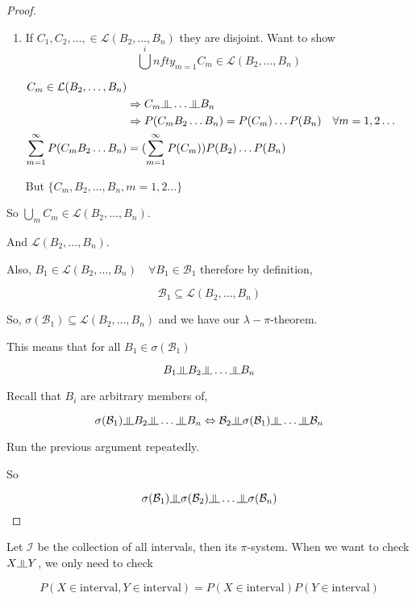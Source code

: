 \documentclass[11pt,fleqn]{book} %
\newcommand{\indep}{\rotatebox[origin=c]{90}{$\models$}}
\begin{document}
\begin{proof}
\begin{enumerate}
		\item If $C_1, C_2, \dots, \in \mathcal{L}(B_2, \dots, B_n)$ they are disjoint. Want to show 
		$$\bigcup^infty_{m=1}C_m \in \mathcal{L}(B_2, \dots, B_n) $$

		$\begin{aligned}
			C_m \in \mathcal{L}(B_2, \dots, B_n)\\
			&\Rightarrow C_m \indep \dots \indep B_n\\
			&\Rightarrow P(C_m B_2 \dots B_n) = P(C_m)\dots P(B_n) \quad \forall m = 1, 2 \dots\\
			\displaystyle \sum^\infty_{m=1} P(C_m B_2 \dots B_n) &= (\displaystyle \sum^\infty_{m=1} P(C_m) )P(B_2)\dots P(B_n)
		\end{aligned}$

		But $\{C_m, B_2, \dots, B_n, m = 1, 2 \dots \}$


		
	\end{enumerate}
 So $\bigcup_m C_m \in \mathcal{L}(B_2, \dots, B_n)$. 

		And $\mathcal{L}(B_2, \dots, B_n)$. 

		Also, $ B_1 \in \mathcal{L}(B_2, \dots, B_n) \quad \forall B_1 \in \mathcal{B}_1$ therefore by definition, 

		$$\mathcal{B}_1 \subseteq \mathcal{L}(B_2, \dots, B_n) $$

So, $ \sigma(\mathcal{B}_1) \subseteq \mathcal{L}(B_2, \dots, B_n)$ and we have our $\lambda-\pi$-theorem.

This means that for all $B_1 \in \sigma(\mathcal{B}_1)$

$$B_1 \indep B_2 \indep \dots \indep B_n $$

Recall that $B_i $ are arbitrary members of,

$$\sigma(\mathcal{B}_1) \indep B_2 \indep \dots \indep B_n \Leftrightarrow \mathcal{B}_2 \indep \sigma(\mathcal{B}_1) \indep \dots \indep \mathcal{B}_n$$

Run the previous argument repeatedly. 

So

$$ \sigma(\mathcal{B}_1) \indep \sigma(\mathcal{B}_2) \indep \dots \indep \sigma(\mathcal{B}_n)$$ 

\end{proof}


\begin{example}
	Let $\mathcal{I}$ be the collection of all intervals, then its $\pi$-system. When we want to check $X \indep Y$, we only need to check

	$$P(X \in \text{interval}, Y \in \text{interval}) = P(X \in \text{interval})P(Y \in \text{interval}) $$
\end{example}
\end{document}
